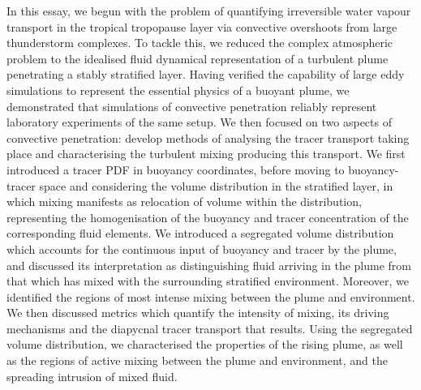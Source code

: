 \documentclass[a4paper]{article}
\begin{document}
In this essay, we begun with the problem of quantifying irreversible water vapour transport in the tropical
tropopause layer via convective overshoots from large thunderstorm complexes. To tackle this,
we reduced the complex atmospheric problem to the idealised fluid dynamical representation of a turbulent
plume penetrating a stably stratified layer. Having verified the capability of large eddy simulations to
represent the essential physics of a buoyant plume, we demonstrated that simulations of convective penetration
reliably represent laboratory experiments of the same setup. We then focused on two aspects of convective
penetration: develop methods of analysing the tracer transport taking place and characterising the turbulent
mixing producing this transport. We first introduced a tracer PDF in buoyancy coordinates, before moving to
buoyancy-tracer space and considering the volume distribution in the stratified layer, in which mixing
manifests as relocation of volume within the distribution, representing the homogenisation of the buoyancy and
tracer concentration of the corresponding fluid elements. We introduced a segregated volume distribution which
accounts for the continuous input of buoyancy and tracer by the plume, and discussed its interpretation as
distinguishing fluid arriving in the plume from that which has mixed with the surrounding stratified
environment.  Moreover, we identified the regions of most intense mixing between the plume and
environment. We then discussed metrics which quantify the intensity of mixing, its driving mechanisms and the
diapycnal tracer transport that results. Using the segregated volume distribution, we characterised the
properties of the rising plume, as well as the regions of active mixing between the plume and environment, and
the spreading intrusion of mixed fluid. 
\end{document}
